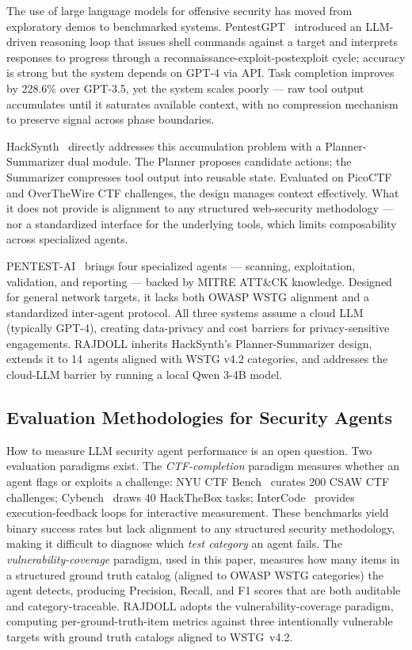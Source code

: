 \documentclass[conference]{IEEEtran}
\begin{document}
The use of large language models for offensive security has moved from exploratory demos to benchmarked systems. PentestGPT~\cite{pentestgpt} introduced an LLM-driven reasoning loop that issues shell commands against a target and interprets responses to progress through a reconnaissance-exploit-postexploit cycle; accuracy is strong but the system depends on GPT-4 via API. Task completion improves by 228.6\% over GPT-3.5, yet the system scales poorly --- raw tool output accumulates until it saturates available context, with no compression mechanism to preserve signal across phase boundaries.

HackSynth~\cite{hacksynth} directly addresses this accumulation problem with a Planner-Summarizer dual module. The Planner proposes candidate actions; the Summarizer compresses tool output into reusable state. Evaluated on PicoCTF and OverTheWire CTF challenges, the design manages context effectively. What it does not provide is alignment to any structured web-security methodology --- nor a standardized interface for the underlying tools, which limits composability across specialized agents.

PENTEST-AI~\cite{pentestai} brings four specialized agents --- scanning, exploitation, validation, and reporting --- backed by MITRE ATT\&CK knowledge. Designed for general network targets, it lacks both OWASP WSTG alignment and a standardized inter-agent protocol. All three systems assume a cloud LLM (typically GPT-4), creating data-privacy and cost barriers for privacy-sensitive engagements. RAJDOLL inherits HackSynth's Planner-Summarizer design, extends it to 14~agents aligned with WSTG v4.2 categories, and addresses the cloud-LLM barrier by running a local Qwen 3-4B model.

\subsection{Evaluation Methodologies for Security Agents}

How to measure LLM security agent performance is an open question.
Two evaluation paradigms exist. The \textit{CTF-completion} paradigm
measures whether an agent flags or exploits a challenge: NYU CTF
Bench~\cite{nyuctfbench} curates 200 CSAW CTF challenges; Cybench~\cite{cybench}
draws 40 HackTheBox tasks; InterCode~\cite{intercodectf} provides
execution-feedback loops for interactive measurement. These benchmarks
yield binary success rates but lack alignment to any structured security
methodology, making it difficult to diagnose which \textit{test category}
an agent fails. The \textit{vulnerability-coverage} paradigm, used in
this paper, measures how many items in a structured ground truth catalog
(aligned to OWASP WSTG categories) the agent detects, producing
Precision, Recall, and F1 scores that are both auditable and
category-traceable. RAJDOLL adopts the vulnerability-coverage paradigm,
computing per-ground-truth-item metrics against three intentionally
vulnerable targets with ground truth catalogs aligned to WSTG~v4.2.
\end{document}
